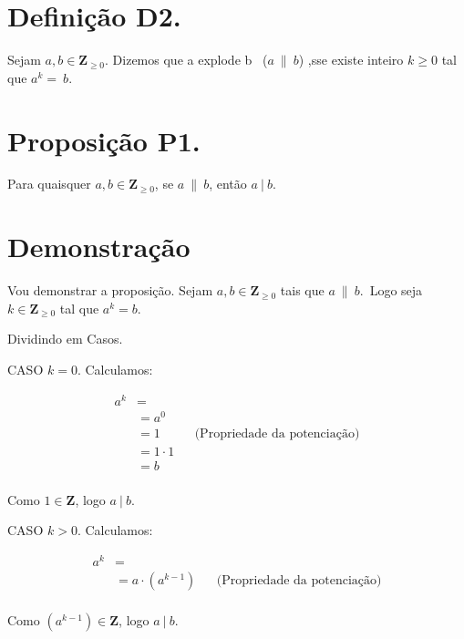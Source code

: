 \documentclass{article}
\author{Dawerton Eduardo Carlos Vaz }
\def \adivb{{$a\ |\ b$}}
\def \aexpb{{$a\ \| \ b$}}
\begin{document}
\section{Definição D2.}
Sejam $a, b \in \mathbf Z _{\ge 0}$. Dizemos que a explode b \ (\aexpb) ,sse existe inteiro $k \ge 0$ tal que $a^k=\ b$.

\section{Proposição P1.}

Para quaisquer $a,b \in \mathbf Z _{\ge 0}$, se \aexpb , então \adivb.

\section{Demonstração}

Vou demonstrar a proposição.\newline
Sejam $a,b \in \mathbf Z _{\ge 0}$ tais que \aexpb.\ Logo seja $k \in \mathbf Z _{\ge 0} $ tal que $a^k=b$.\newline

Dividindo em Casos.\newline

CASO $k=0$. Calculamos:\newline



\begin{align*}
a^k& =
&& \text{}\\
& =a^0
&& \text{}\\
& = 1
&& \text{(Propriedade da potenciação)}\\
& = 1\cdot1
&& \text{}\\
& = b
&& \text{}\\
\end{align*}

Como $1 \in \mathbf Z$, logo \adivb. \newline

CASO $k>0$. Calculamos:




\begin{align*}
a^k& =
&& \text{}\\
& =a \cdot (a^{k-1})
&& \text{(Propriedade da potenciação)}\\
\end{align*}

Como $(a^{k-1}) \in \mathbf Z$, logo \adivb. \RectangleBold

\end{document}

